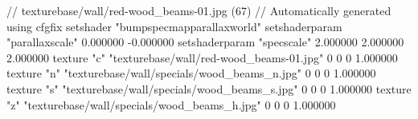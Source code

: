 // texturebase/wall/red-wood_beams-01.jpg (67)
// Automatically generated using cfgfix
setshader "bumpspecmapparallaxworld"
setshaderparam "parallaxscale" 0.000000 -0.000000
setshaderparam "specscale" 2.000000 2.000000 2.000000
texture "c" "texturebase/wall/red-wood_beams-01.jpg" 0 0 0 1.000000
texture "n" "texturebase/wall/specials/wood_beams_n.jpg" 0 0 0 1.000000
texture "s" "texturebase/wall/specials/wood_beams_s.jpg" 0 0 0 1.000000
texture "z" "texturebase/wall/specials/wood_beams_h.jpg" 0 0 0 1.000000
